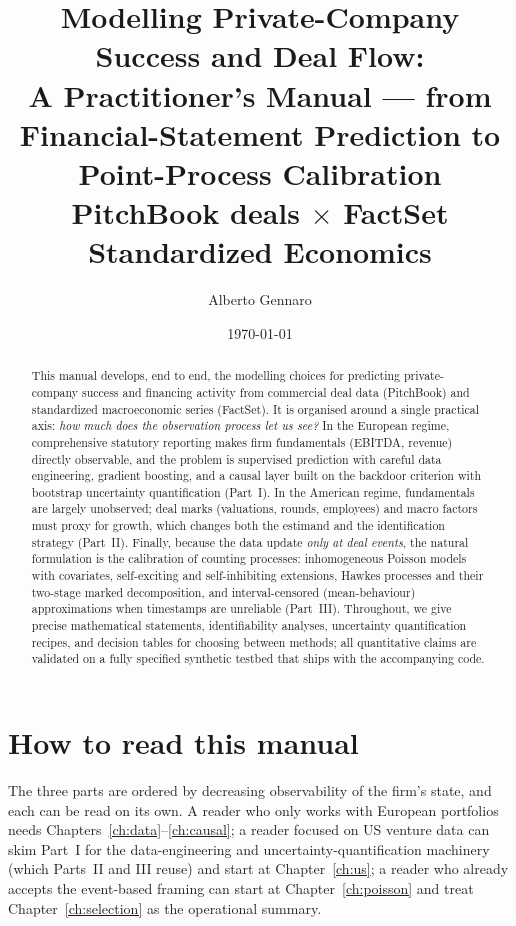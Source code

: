 \documentclass[11pt,a4paper]{report}
\title{\bfseries Modelling Private-Company Success and Deal Flow:\\
\large A Practitioner's Manual --- from Financial-Statement Prediction to
Point-Process Calibration\\[1ex]
\normalsize PitchBook deals $\times$ FactSet Standardized Economics}
\author{Alberto Gennaro}
\date{\today}
\theoremstyle{plain}
\theoremstyle{definition}
\theoremstyle{remark}
\begin{document}
\maketitle

\begin{abstract}
\noindent
This manual develops, end to end, the modelling choices for predicting private-company
success and financing activity from commercial deal data (PitchBook) and standardized
macroeconomic series (FactSet). It is organised around a single practical axis: \emph{how
much does the observation process let us see?} In the European regime, comprehensive
statutory reporting makes firm fundamentals (EBITDA, revenue) directly observable, and the
problem is supervised prediction with careful data engineering, gradient boosting, and a
causal layer built on the backdoor criterion with bootstrap uncertainty quantification
(Part~I). In the American regime, fundamentals are largely unobserved; deal marks
(valuations, rounds, employees) and macro factors must proxy for growth, which changes both
the estimand and the identification strategy (Part~II). Finally, because the data update
\emph{only at deal events}, the natural formulation is the calibration of counting
processes: inhomogeneous Poisson models with covariates, self-exciting and self-inhibiting
extensions, Hawkes processes and their two-stage marked decomposition, and
interval-censored (mean-behaviour) approximations when timestamps are unreliable
(Part~III). Throughout, we give precise mathematical statements, identifiability analyses,
uncertainty quantification recipes, and decision tables for choosing between methods; all
quantitative claims are validated on a fully specified synthetic testbed that ships with
the accompanying code.
\end{abstract}

\tableofcontents

\chapter*{How to read this manual}

The three parts are ordered by decreasing observability of the firm's state, and each can
be read on its own. A reader who only works with European portfolios needs
Chapters~\ref{ch:data}--\ref{ch:causal}; a reader focused on US venture data can skim
Part~I for the data-engineering and uncertainty-quantification machinery (which Parts~II
and III reuse) and start at Chapter~\ref{ch:us}; a reader who already accepts the
event-based framing can start at Chapter~\ref{ch:poisson} and treat
Chapter~\ref{ch:selection} as the operational summary.
\end{document}
